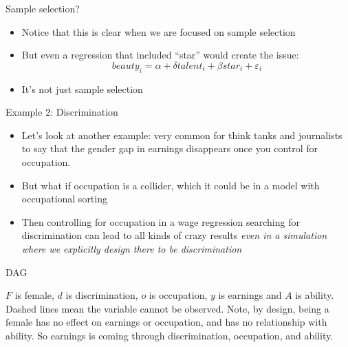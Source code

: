 \documentclass{beamer}
\begin{document}
\begin{frame}{Sample selection?}

\begin{itemize}
\item Notice that this is clear when we are focused on sample selection
\item But even a regression that included ``star'' would create the issue:$$beauty_i = \alpha + \delta talent_i + \beta star_i + \varepsilon_i$$
\item It's not just sample selection 
\end{itemize}

\end{frame}


\begin{frame}{Example 2: Discrimination}

  \begin{itemize}
    \item Let's look at another example: very common for think tanks and journalists to say that the gender gap in earnings disappears once you control for occupation.
    \item But what if occupation is a collider, which it could be in a model with occupational sorting
    \item Then controlling for occupation in a wage regression searching for discrimination can lead to all kinds of crazy results \emph{even in a simulation where we explicitly design there to be discrimination}
  \end{itemize}

\end{frame}

\begin{frame}{DAG}

  \begin{center}
  \end{center}

  $F$ is female, $d$ is discrimination, $o$ is occupation, $y$ is earnings and $A$ is ability. Dashed lines mean the variable cannot be observed. Note, by design, being a female has no effect on earnings or occupation, and has no relationship with ability. So earnings is coming through discrimination, occupation, and ability.

\end{frame}
\end{document}
